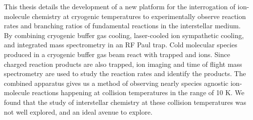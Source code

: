 This thesis details the development of a new platform for the interrogation of ion-molecule chemistry at cryogenic temperatures to experimentally observe reaction rates and branching ratios of fundamental reactions in the interstellar medium. By combining cryogenic buffer gas cooling, laser-cooled ion sympathetic cooling, and integrated mass spectrometry in an RF Paul trap. Cold molecular species produced in a cryogenic buffer gas beam react with trapped  and  ions. Since charged reaction products are also trapped, ion imaging and time of flight mass spectrometry are used to study the reaction rates and identify the products. The combined apparatus gives us a method of observing nearly species agnostic ion-molecule reactions happening at collision temperatures in the range of 10 K. We found that the study of interstellar chemistry at these collision temperatures was not well explored, and an ideal avenue to explore.
